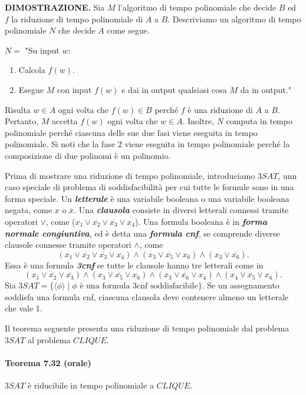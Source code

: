 \documentclass{article}
\begin{document}
\text{}
\newline
\textbf{DIMOSTRAZIONE.} 
Sia $M$ l'algoritmo di tempo polinomiale che decide $B$ ed $f$ la riduzione di tempo polinomiale di $A$ a $B$. 
Descriviamo un algoritmo di tempo polinomiale $N$ che decide $A$ come segue.

\text{}
\newline
$N =$ "Su input $w$:
\begin{enumerate}
    \item Calcola $f(w)$.
    \item Esegue $M$ con input $f(w)$ e dai in output qualsiasi cosa $M$ da in output."
\end{enumerate}
Risulta $w \in A$ ogni volta che $f(w) \in B$ perché $f$ è una riduzione di $A$ a
$B$. Pertanto, $M$ accetta $f(w)$ ogni volta che $w \in A$. 
Inoltre, $N$ computa in tempo polinomiale perché ciascuna delle sue due fasi viene eseguita in tempo polinomiale. 
Si noti che la fase 2 viene eseguita in tempo polinomiale perché la composizione di due polinomi è un polinomio.

\text{}
\newline
Prima di mostrare una riduzione di tempo polinomiale, introduciamo $3SAT$, unn caso speciale di problema di soddisfacibilità per cui tutte le formule sono in una forma speciale.
Un \textit{\textbf{letterale}} è una variabile booleana o una variabile booleana negata, come $x$ o $\overline{x}$. 
Una \textit{\textbf{clausola}} consiste in diversi letterali connessi tramite operatori $\lor$, come ($x_1 \lor \overline{x_2} \lor \overline{x_3} \lor x_4$).
Una formula booleana è in \textit{\textbf{forma normale congiuntiva}}, ed è detta una \textit{\textbf{formula cnf}}, se comprende diverse clausole connesse tramite operatori $\land$, come
$$
(x_1 \lor \overline{x_2} \lor \overline{x_3} \lor x_4) \land (x_3 \lor \overline{x_5} \lor x_6) \land (x_3 \lor \overline{x_6}).
$$
Essa è una formula \textit{\textbf{3cnf}} se tutte le clausole hanno tre letterali come in 
$$
(x_1 \lor \overline{x_2} \lor \overline{x_3}) \land (x_3 \lor \overline{x_5} \lor x_6) \land (x_3 \lor \overline{x_6} \lor x_4) \land (x_4 \lor x_5 \lor x_6).
$$
Sia $3SAT = \{ \langle \phi \rangle \mid \phi \text{ è una formula 3cnf soddisfacibile} \}$.
Se un assegnamento soddisfa una formula cnf, ciascuna clausola deve contenere almeno un letterale che vale 1.

Il teorema seguente presenta una riduzione di tempo polinomiale dal problema $3SAT$ al problema $CLIQUE$.

\paragraph{Teorema 7.32 (orale)}
\label{teorema-7.32}
\vspace{1em}
\text{}
\newline
$3SAT$ è riducibile in tempo polinomiale a $CLIQUE$.
\end{document}
